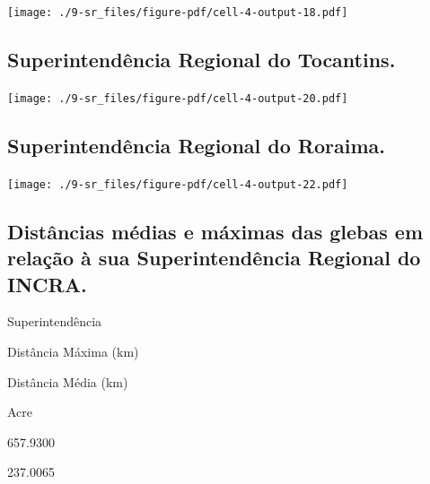 \documentclass[
  letterpaper,
]{report}
\begin{document}
\texttt{[image: ./9-sr\_files/figure-pdf/cell-4-output-18.pdf]}

\hypertarget{superintenduxeancia-regional-do-tocantins.}{%
\subsection{Superintendência Regional do
Tocantins.}\label{superintenduxeancia-regional-do-tocantins.}}

\texttt{[image: ./9-sr\_files/figure-pdf/cell-4-output-20.pdf]}

\hypertarget{superintenduxeancia-regional-do-roraima.}{%
\subsection{Superintendência Regional do
Roraima.}\label{superintenduxeancia-regional-do-roraima.}}

\texttt{[image: ./9-sr\_files/figure-pdf/cell-4-output-22.pdf]}

\hypertarget{distuxe2ncias-muxe9dias-e-muxe1ximas-das-glebas-em-relauxe7uxe3o-uxe0-sua-superintenduxeancia-regional-do-incra.}{%
\subsection{Distâncias médias e máximas das glebas em relação à sua
Superintendência Regional do
INCRA.}\label{distuxe2ncias-muxe9dias-e-muxe1ximas-das-glebas-em-relauxe7uxe3o-uxe0-sua-superintenduxeancia-regional-do-incra.}}

\n  

\n    

\n      

Superintendência

\n      

Distância Máxima (km)

\n      

Distância Média (km)

\n    

\n  

\n  

\n    

\n      

Acre

\n      

657.9300

\n      

237.0065

\n    

\n    
\end{document}
